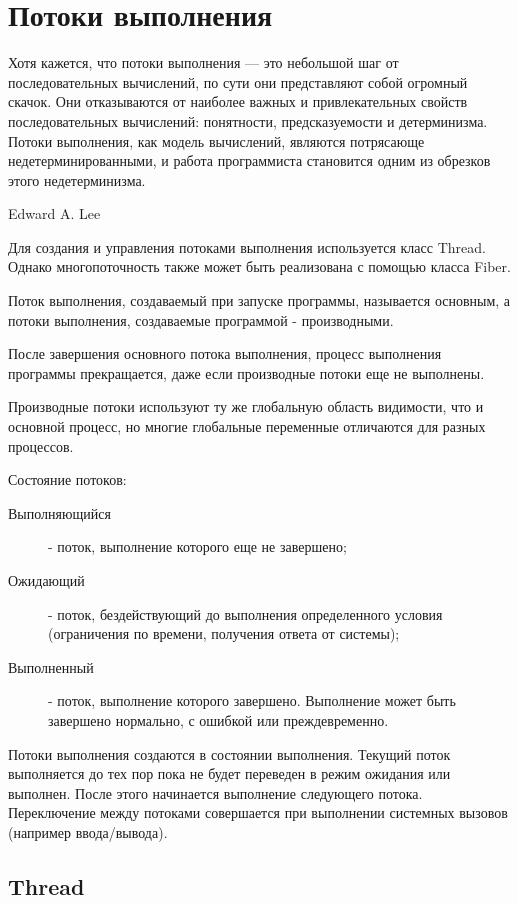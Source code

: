 \section{Потоки выполнения}

\epigraph
{Хотя кажется, что потоки выполнения — это небольшой шаг от последовательных вычислений, по сути они представляют собой огромный скачок. Они отказываются от наиболее важных и привлекательных свойств последовательных вычислений: понятности, предсказуемости и детерминизма. Потоки выполнения, как модель вычислений, являются потрясающе недетерминированными, и работа программиста становится одним из обрезков этого недетерминизма.}
{Edward A. Lee}

Для создания и управления потоками выполнения используется класс Thread. Однако многопоточность также может быть реализована с помощью класса Fiber.

Поток выполнения, создаваемый при запуске программы, называется основным, а потоки выполнения, создаваемые программой - производными.

После завершения основного потока выполнения, процесс выполнения программы прекращается, даже если производные потоки еще не выполнены.

Производные потоки используют ту же глобальную область видимости, что и основной процесс, но многие глобальные переменные отличаются для разных процессов.

Состояние потоков:
\begin{description}
  \item[Выполняющийся] - поток, выполнение которого еще не завершено; 
  \item[Ожидающий] - поток, бездействующий до выполнения определенного условия (ограничения по времени, получения ответа от системы);
  \item[Выполненный] - поток, выполнение которого завершено. Выполнение может быть завершено нормально, с ошибкой или преждевременно.
\end{description}

Потоки выполнения создаются в состоянии выполнения. Текущий поток выполняется до тех пор пока не будет переведен в режим ожидания или выполнен. После этого начинается выполнение следующего потока. Переключение между потоками совершается при выполнении системных вызовов (например ввода/вывода). 

\subsection{Thread}

